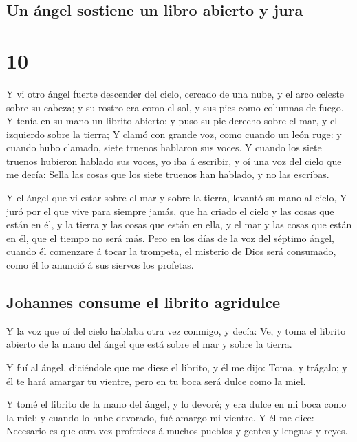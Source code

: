 \hypertarget{un-uxe1ngel-sostiene-un-libro-abierto-y-jura}{%
\subsection{Un ángel sostiene un libro abierto y
jura}\label{un-uxe1ngel-sostiene-un-libro-abierto-y-jura}}

\hypertarget{section-9}{%
\section{10}\label{section-9}}

 Y vi otro ángel fuerte descender del cielo, cercado de una
nube, y el arco celeste sobre su cabeza; y su rostro era como el sol, y
sus pies como columnas de fuego.  Y tenía en su mano un
librito abierto: y puso su pie derecho sobre el mar, y el izquierdo
sobre la tierra;  Y clamó con grande voz, como cuando un
león ruge: y cuando hubo clamado, siete truenos hablaron sus voces.
 Y cuando los siete truenos hubieron hablado sus voces, yo
iba á escribir, y oí una voz del cielo que me decía: Sella las cosas que
los siete truenos han hablado, y no las escribas.

 Y el ángel que vi estar sobre el mar y sobre la tierra,
levantó su mano al cielo,  Y juró por el que vive para
siempre jamás, que ha criado el cielo y las cosas que están en él, y la
tierra y las cosas que están en ella, y el mar y las cosas que están en
él, que el tiempo no será más.  Pero en los días de la voz
del séptimo ángel, cuando él comenzare á tocar la trompeta, el misterio
de Dios será consumado, como él lo anunció á sus siervos los profetas.

\hypertarget{johannes-consume-el-librito-agridulce}{%
\subsection{Johannes consume el librito
agridulce}\label{johannes-consume-el-librito-agridulce}}

 Y la voz que oí del cielo hablaba otra vez conmigo, y
decía: Ve, y toma el librito abierto de la mano del ángel que está sobre
el mar y sobre la tierra.

 Y fuí al ángel, diciéndole que me diese el librito, y él me
dijo: Toma, y trágalo; y él te hará amargar tu vientre, pero en tu boca
será dulce como la miel.

 Y tomé el librito de la mano del ángel, y lo devoré; y era
dulce en mi boca como la miel; y cuando lo hube devorado, fué amargo mi
vientre.  Y él me dice: Necesario es que otra vez
profetices á muchos pueblos y gentes y lenguas y reyes.

